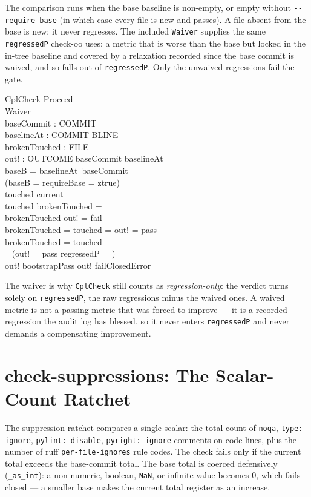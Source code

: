 \documentclass[a4paper,10pt,fleqn]{article}
\begin{document}
The comparison runs when the base baseline is non-empty, or empty without
\texttt{-{}-require-base} (in which case every file is new and passes). A
file absent from the base is new: it never regresses. The included
\texttt{Waiver} supplies the same \texttt{regressedP} check-oo uses: a metric
that is worse than the base but locked in the in-tree baseline and covered by a
relaxation recorded since the base commit is waived, and so falls out of
\texttt{regressedP}. Only the unwaived regressions fail the gate.

\begin{schema}{CplCheck}
Proceed \\
Waiver \\
baseCommit : COMMIT \\
baselineAt : COMMIT \pfun BLINE \\
brokenTouched : \finset FILE \\
out! : OUTCOME
\where
baseCommit \in \dom baselineAt \\
baseB = baselineAt~baseCommit \\
\lnot (baseB = \emptyset \land requireBase = ztrue) \\
touched \subseteq \dom current \\
touched \cap brokenTouched = \emptyset \\
brokenTouched \neq \emptyset \implies out! = fail \\
brokenTouched = \emptyset \land touched = \emptyset \implies out! = pass \\
brokenTouched = \emptyset \land touched \neq \emptyset \implies \\
\quad~ (out! = pass \iff regressedP = \emptyset) \\
out! \neq bootstrapPass \land out! \neq failClosedError
\end{schema}

The waiver is why \texttt{CplCheck} still counts as \emph{regression-only}: the
verdict turns solely on \texttt{regressedP}, the raw regressions minus the
waived ones. A waived metric is not a passing metric that was forced to
improve --- it is a recorded regression the audit log has blessed, so it never
enters \texttt{regressedP} and never demands a compensating improvement.

\section{check-suppressions: The Scalar-Count Ratchet}

The suppression ratchet compares a single scalar: the total count of
\texttt{noqa}, \texttt{type: ignore}, \texttt{pylint: disable},
\texttt{pyright: ignore} comments on code lines, plus the number of ruff
\texttt{per-file-ignores} rule codes. The check fails only if the current
total exceeds the base-commit total. The base total is coerced defensively
(\texttt{\_as\_int}): a non-numeric, boolean, \texttt{NaN}, or infinite
value becomes $0$, which fails closed --- a smaller base makes the current
total register as an increase.
\end{document}
